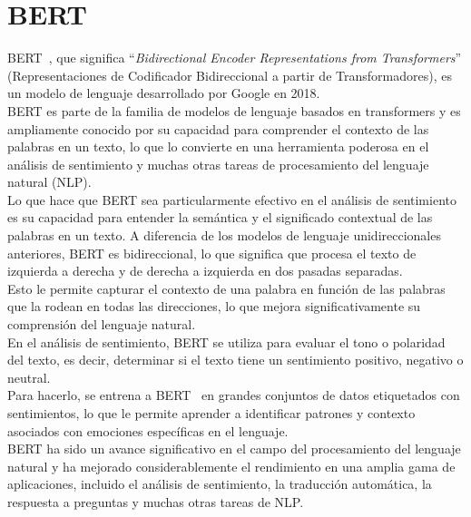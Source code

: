 
\section{BERT}

BERT~\cite{devlin2019bert}, que significa ``\emph{Bidirectional Encoder Representations from Transformers}''
(Representaciones de Codificador Bidireccional a partir de Transformadores),
es un modelo de lenguaje desarrollado por Google en 2018.\\
BERT es parte de la familia de modelos de lenguaje basados en transformers
y es ampliamente conocido por su capacidad para comprender el contexto
de las palabras en un texto, lo que lo convierte en una herramienta
poderosa en el análisis de sentimiento y muchas otras tareas de procesamiento
del lenguaje natural (NLP).\\
Lo que hace que BERT sea particularmente efectivo en el análisis de sentimiento
es su capacidad para entender la semántica y el significado contextual de las palabras en un texto.
A diferencia de los modelos de lenguaje unidireccionales anteriores,
BERT es bidireccional, lo que significa que procesa el texto de izquierda a derecha y
de derecha a izquierda en dos pasadas separadas.\\
Esto le permite capturar el contexto de una palabra en función de las
palabras que la rodean en todas las direcciones, lo que mejora significativamente
su comprensión del lenguaje natural.\\
En el análisis de sentimiento, BERT se utiliza para evaluar el tono
o polaridad del texto, es decir, determinar si el texto tiene un sentimiento positivo,
negativo o neutral.\\ 
Para hacerlo, se entrena a BERT~\cite{BertSentimentModel1}
en grandes conjuntos de datos etiquetados con sentimientos, lo que le permite aprender
a identificar patrones y contexto asociados con emociones específicas en el lenguaje.\\
BERT ha sido un avance significativo en el campo del procesamiento
del lenguaje natural y ha mejorado considerablemente el rendimiento
en una amplia gama de aplicaciones, incluido el análisis de sentimiento,
la traducción automática, la respuesta a preguntas y muchas otras tareas de NLP.

